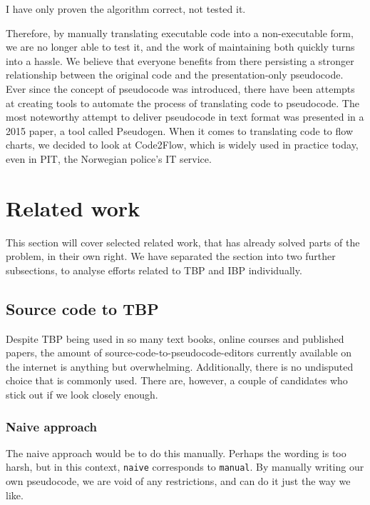 \begin{displayquote}
    I have only proven the algorithm correct, not tested it.\cite{DBLP:books/aw/Knuth68}
\end{displayquote}

Therefore, by manually translating executable code into a non-executable form, we are no longer able to test it, and the work of maintaining both quickly turns into a hassle. We believe that everyone benefits from there persisting a stronger relationship between the original code and the presentation-only pseudocode. \hfill \\

Ever since the concept of pseudocode was introduced, there have been attempts at creating tools to automate the process of translating code to pseudocode. The most noteworthy attempt to deliver pseudocode in text format was presented in a 2015 paper, a tool called Pseudogen. When it comes to translating code to flow charts, we decided to look at Code2Flow, which is widely used in practice today, even in PIT, the Norwegian police's IT service. \hfill \\



\section{Related work}

This section will cover selected related work, that has already solved parts of the problem, in their own right. We have separated the section into two further subsections, to analyse efforts related to TBP and IBP individually.

\subsection{Source code to TBP}

Despite TBP being used in so many text books, online courses and published papers, the amount of source-code-to-pseudocode-editors currently available on the internet is anything but overwhelming. Additionally, there is no undisputed choice that is commonly used. There are, however, a couple of candidates who stick out if we look closely enough.

\subsubsection{Naive approach}

The naive approach would be to do this manually. Perhaps the wording is too harsh, but in this context, \texttt{naive} corresponds to \texttt{manual}. By manually writing our own pseudocode, we are void of any restrictions, and can do it just the way we like. \\

